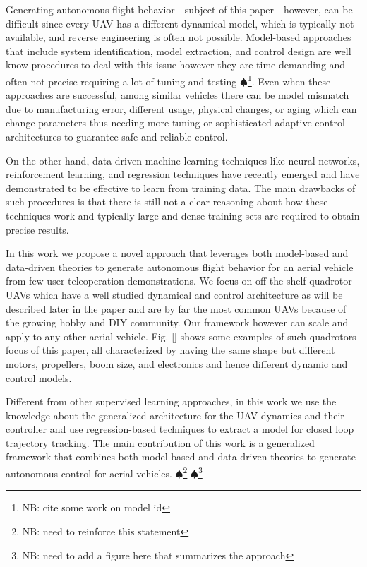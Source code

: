 \documentclass[letterpaper, 10 pt, conference]{ieeeconf}  %
\newcommand\NB[1]{$\spadesuit$\footnote{NB: #1}}
\begin{document}
Generating autonomous flight behavior - subject of this paper -  however, can be difficult since every UAV has a different dynamical model, which is typically not available, and reverse engineering is often not possible. Model-based approaches that include system identification, model extraction, and control design are well know procedures to deal with this issue however they are time demanding and often not precise requiring a lot of tuning and testing \NB{cite some work on model id}. Even when these approaches are successful, among similar vehicles there can be model mismatch due to manufacturing error, different usage, physical changes, or aging which can change parameters thus needing more tuning or sophisticated adaptive control architectures to guarantee safe and reliable control. 

On the other hand, data-driven machine learning techniques like neural networks, reinforcement learning, and regression techniques have recently emerged and have demonstrated to be effective to learn from training data. The main drawbacks of such procedures is that there is still not a clear reasoning about how these techniques work and typically large and dense training sets are required to obtain precise results.

In this work we propose a novel approach that leverages both model-based and data-driven theories to generate autonomous flight behavior for an aerial vehicle from few user teleoperation demonstrations. 
We focus on off-the-shelf quadrotor UAVs which have a well studied dynamical and control architecture as will be described later in the paper and are by far the most common UAVs because of the growing hobby and DIY community. Our framework however can scale and apply to any other aerial vehicle. Fig. \ref{} shows some examples of such quadrotors focus of this paper, all characterized by having the same shape but different motors, propellers, boom size, and electronics and hence different dynamic and control models.

Different from other supervised learning approaches, in this work we use the knowledge about the generalized architecture for the UAV dynamics and their controller and use regression-based techniques to extract a model for closed loop trajectory tracking. The main contribution of this work is a generalized framework that combines both model-based and data-driven theories to generate autonomous control for aerial vehicles. 
\NB{need to reinforce this statement}
\NB{need to add a figure here that summarizes the approach}
 
\end{document}
